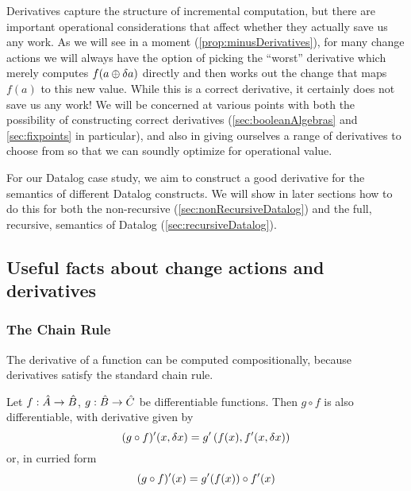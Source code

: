 Derivatives capture the structure of incremental computation, but there are
important operational considerations that affect whether they actually save us
any work. As we will see in a moment (\cref{prop:minusDerivatives}), for many 
change actions we will always have the option
of picking the ``worst'' derivative which merely computes $f(a \oplus \delta a)$
directly and then works out the change that maps $f(a)$ to this new value. While this is a correct
derivative, it certainly does not save us any work! We will be concerned at
various points with both the possibility of constructing correct derivatives
(\cref{sec:booleanAlgebras} and \cref{sec:fixpoints} in particular), and also in
giving ourselves a range of derivatives to choose from so that we can soundly
optimize for operational value.

For our Datalog case study, we aim to construct a good derivative for the semantics of
different Datalog constructs. We will show in later sections how to do this for both the
non-recursive (\cref{sec:nonRecursiveDatalog}) and the full, recursive, semantics of Datalog
(\cref{sec:recursiveDatalog}).

\subsection{Useful facts about change actions and derivatives}

\subsubsection{The Chain Rule}

The derivative of a function can be computed compositionally, because derivatives satisfy the standard chain rule.

\begin{thm}
  Let $f: \hat{A} \rightarrow \hat{B}$, $g: \hat{B} \rightarrow \hat{C}$ be differentiable functions. Then $g \circ f$ is also
  differentiable, with derivative given by
  \begin{displaymath}
    (g \circ f)'(x, \delta x) = g'\left(f(x), f'(x, \delta x)\right)
  \end{displaymath}
  or, in curried form
  \begin{displaymath}
    (g \circ f)'(x) = g'(f(x)) \circ f'(x)
  \end{displaymath}
\end{thm}

